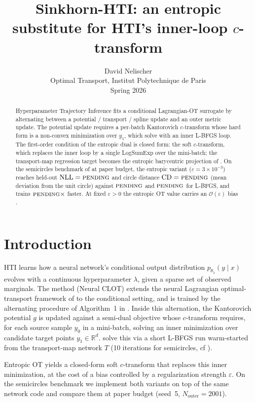 \documentclass[11pt,a4paper]{article}
\title{Sinkhorn-HTI: an entropic substitute for HTI's inner-loop $c$-transform}
\author{David Nelischer\\[2pt] \small Optimal Transport, Institut Polytechnique de Paris\\ \small Spring 2026}
\date{}
\newcommand{\R}{\mathbb{R}}
\newcommand{\nOuter}{2001}%
\newcommand{\theSeed}{5}%
\newcommand{\nllLbfgs}{\textsc{pending}}%
\newcommand{\nllEnt}{\textsc{pending}}%
\newcommand{\cdLbfgs}{\textsc{pending}}%
\newcommand{\cdEnt}{\textsc{pending}}%
\newcommand{\wallRatio}{\textsc{pending}}%
\begin{document}
\maketitle

\begin{abstract}
Hyperparameter Trajectory Inference \citep[HTI;][]{amad2026hti} fits a
conditional Lagrangian-OT surrogate by alternating between a potential /
transport / spline update and an outer metric update. The potential
update requires a per-batch Kantorovich $c$-transform whose hard form
is a non-convex minimization over $y_1$, which \citet{amad2026hti}
solve with an inner L-BFGS loop. The first-order condition of the
entropic dual is closed form: the soft $c$-transform, which replaces
the inner loop by a single LogSumExp over the mini-batch; the
transport-map regression target becomes the entropic barycentric
projection of \citet{pooladian2021entropic}. On the semicircles
benchmark of \citet{amad2026hti} at paper budget, the entropic variant
($\varepsilon=3\times 10^{-3}$) reaches held-out
$\mathrm{NLL}=\nllEnt$ and circle distance $\mathrm{CD}=\cdEnt$ (mean
deviation from the unit circle) against $\nllLbfgs$ and $\cdLbfgs$
for L-BFGS, and trains
$\wallRatio\times$ faster. At fixed $\varepsilon>0$ the entropic OT
value carries an $\mathcal{O}(\varepsilon)$ bias \citep{pal2024difference}.
\end{abstract}

\section{Introduction}
\label{sec:intro}

HTI \citep{amad2026hti} learns how a neural network's conditional output
distribution $p_{\theta_\lambda}(y\mid x)$ evolves with a continuous
hyperparameter $\lambda$, given a sparse set of observed marginals. The
method (Neural CLOT) extends the neural Lagrangian optimal-transport
framework of \citet{pooladian2024nlot} to the conditional setting,
and is trained by the alternating procedure of Algorithm~1 in
\citet{amad2026hti}. Inside this alternation, the Kantorovich potential $g$
is updated against a semi-dual objective whose $c$-transform requires,
for each source sample $y_0$ in a mini-batch, solving an inner
minimization over candidate target points $y_1\in\R^d$. \citet{amad2026hti} solve this via a short L-BFGS run
warm-started from the transport-map network $T$ (10 iterations for
semicircles, cf \citealt{amad2026hti}).

\smallskip
Entropic OT yields a closed-form soft $c$-transform that replaces
this inner minimization, at the cost of a bias controlled by a
regularization strength $\varepsilon$. On the semicircles benchmark we implement both
variants on top of the same network code and compare them at paper
budget (seed~\theSeed{}, $N_{\text{outer}}=\nOuter$).
\end{document}

